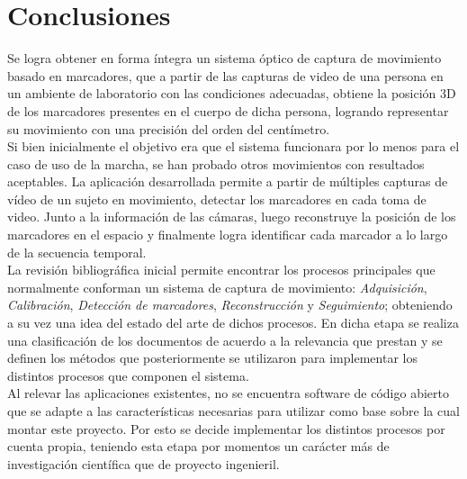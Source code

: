 \chapter{Conclusiones}
\label{conclusiones}



Se logra obtener en forma íntegra un sistema óptico de captura de movimiento basado en marcadores, que a partir de las capturas de video de una persona en un ambiente de laboratorio con las condiciones adecuadas, obtiene la posición 3D de  los marcadores presentes en el cuerpo de dicha persona, logrando representar su movimiento con una precisión del orden del centímetro.\\


Si bien inicialmente el objetivo era que el sistema funcionara por lo menos para el caso de uso de la marcha, se han probado otros  movimientos con resultados aceptables. La aplicación desarrollada permite a partir de múltiples capturas de vídeo de un sujeto en movimiento, detectar los marcadores en cada toma de video. Junto a la información de las cámaras, luego reconstruye la posición de los marcadores en el espacio y finalmente logra identificar cada marcador a lo largo de la secuencia temporal.\\ 


La revisión bibliográfica inicial permite encontrar los procesos principales que normalmente conforman un sistema de captura de movimiento: \emph{Adquisición}, \emph{Calibración}, \emph{Detección de marcadores}, \emph{Reconstrucción} y \emph{Seguimiento};  obteniendo a su vez una idea del estado del arte de dichos procesos. En dicha etapa se realiza una clasificación de los documentos de acuerdo a la relevancia que prestan y se definen los métodos que posteriormente se utilizaron para implementar los distintos procesos que componen el sistema. \\  

Al relevar las aplicaciones existentes, no se encuentra software de código abierto que se adapte a las características necesarias para utilizar como base sobre la cual montar este proyecto. Por esto se decide implementar los distintos procesos por cuenta propia, teniendo esta etapa por momentos un carácter más de investigación científica que de proyecto ingenieril.\\

